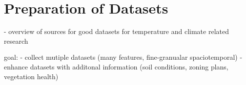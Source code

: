 \chapter{Preparation of Datasets}
\label{chap:preparations data sets}

- overview of sources for good datasets for temperature and climate related research

goal:
- collect mutiple datasets (many features, fine-granualar spaciotemporal)
- enhance datasets with additonal information (soil conditions, zoning plans, vegetation health)
